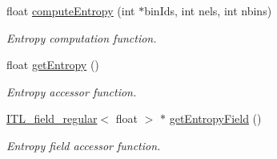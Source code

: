 \begin{DoxyCompactItemize}
float \hyperlink{classITL__entropy_a2c5655a1f68d7942dc98d98fe330660a}{computeEntropy} (int $\ast$binIds, int nels, int nbins)
\begin{DoxyCompactList}\small\item\em Entropy computation function. \item\end{DoxyCompactList}\item 
float \hyperlink{classITL__entropy_ad953a52d2910a04ead0fc40e5af10590}{getEntropy} ()
\begin{DoxyCompactList}\small\item\em Entropy accessor function. \item\end{DoxyCompactList}\item 
\hyperlink{classITL__field__regular}{ITL\_\-field\_\-regular}$<$ float $>$ $\ast$ \hyperlink{classITL__entropy_a640b8cb03be2ce05dcdb5ffa683dd9c9}{getEntropyField} ()
\begin{DoxyCompactList}\small\item\em Entropy field accessor function. \item\end{DoxyCompactList}\end{DoxyCompactItemize}
